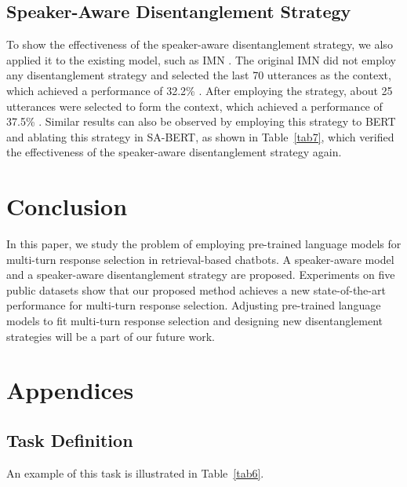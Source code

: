 \documentclass[sigconf]{acmart}
\begin{document}
  \subsection{Speaker-Aware Disentanglement Strategy}
    To show the effectiveness of the speaker-aware disentanglement strategy, we also applied it to the existing model, such as IMN \cite{DBLP:conf/cikm/GuLL19}.
    The original IMN did not employ any disentanglement strategy and selected the last 70 utterances as the context, which achieved a performance of 32.2\% .
    After employing the strategy, about 25 utterances were selected to form the context, which achieved a performance of 37.5\% .
    Similar results can also be observed by employing this strategy to BERT and ablating this strategy in SA-BERT, as shown in Table~\ref{tab7}, which verified the effectiveness of the speaker-aware disentanglement strategy again.


\section{Conclusion}
  In this paper, we study the problem of employing pre-trained language models for multi-turn response selection in retrieval-based chatbots.
  A speaker-aware model and a speaker-aware disentanglement strategy are proposed.
  Experiments on five public datasets show that our proposed method achieves a new state-of-the-art performance for multi-turn response selection.
  Adjusting pre-trained language models to fit multi-turn response selection and designing new disentanglement strategies will be a part of our future work.
  








\clearpage

\appendix

\section{Appendices}

\subsection{Task Definition}

  An example of this task is illustrated in Table~\ref{tab6}.
\end{document}
